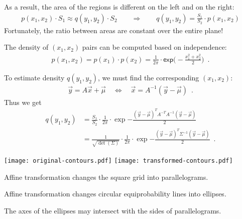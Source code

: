 \documentclass[landscape,footrule]{foils}
\newcommand{\lastline}{\vspace*{-2ex}}
\begin{document}
As a result, the area of the regions is different on the left and on the right:
\begin{align*}
p(x_1,x_2)\cdot S_1\approx q(y_1,y_2)\cdot S_2\qquad\Longrightarrow\qquad q(y_1,y_2)={\frac{S_1}{S_2}}\cdot p(x_1,x_2) 
\end{align*}
Fortunately, the ratio between areas are constant over the entire plane!\lastline

  

\enlargethispage{1cm}
The density of $(x_1,x_2)$ pairs can be computed based on independence:
\begin{align*}
p(x_1,x_2)=p(x_1)\cdot p(x_2)=\frac{1}{2\pi}\cdot\mathsf{exp}\Biggl(-\frac{x_1^2+x_2^2}{2}\Biggl)\enspace.
\end{align*}
\vspace*{-3ex}

To estimate density $q(y_1,y_2)$, we must find the corresponding $(x_1,x_2)$:
\begin{align*}
 \vec{y}=A\vec{x}+\vec{\mu}\quad\Leftrightarrow\quad \vec{x}=A^{-1}(\vec{y}-\vec{\mu})\enspace. 
\end{align*}
Thus we get \vspace*{-2ex}
\begin{align*}
q(y_1,y_2)&=\frac{S_1}{S_2}\cdot\frac{1}{2\pi}\cdot
\exp{-\frac{(\vec{y}-\vec{\mu})^T A^{-T}A^{-1}(\vec{y}-\vec{\mu})}{2}}\\
&=\frac{1}{\sqrt{\det(\Sigma)}}\cdot\frac{1}{2\pi}\cdot
\exp{-\frac{(\vec{y}-\vec{\mu})^T \Sigma^{-1}(\vec{y}-\vec{\mu})}{2}}\enspace.
\end{align*}

 

 
\begin{center}
\texttt{[image: original-contours.pdf]}
\texttt{[image: transformed-contours.pdf]}
\end{center}\vspace*{-0cm}

\begin{triangles}
\item Affine transformation changes the square grid into parallelograms. 
\item Affine transformation changes circular equiprobability lines into ellipses. 
\item The axes of the ellipses may intersect with the sides of parallelograms.
\end{triangles}
\end{document}
